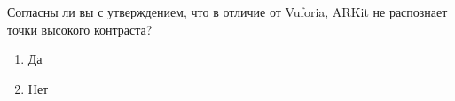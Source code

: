 
Согласны ли вы с утверждением, что в отличие от Vuforia, ARKit не распознает точки высокого контраста?

\begin{enumerate}
    \item Да
    \item Нет
\end{enumerate}

